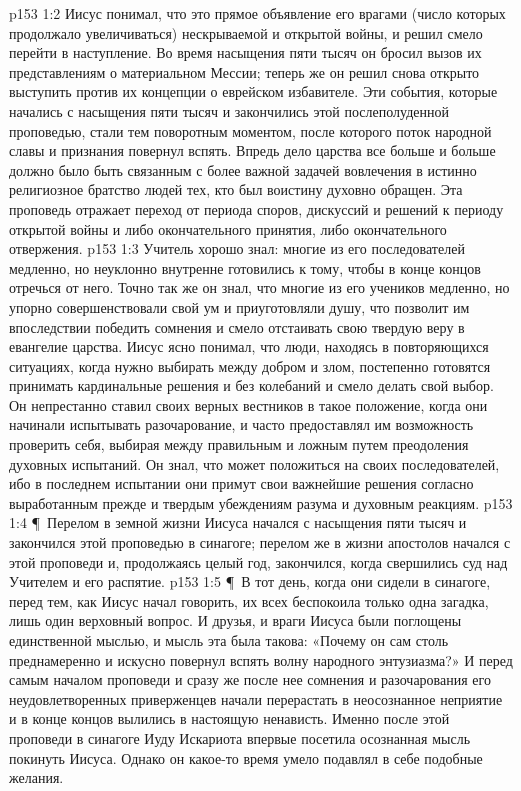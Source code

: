 \vs p153 1:2 Иисус понимал, что это прямое объявление его врагами (число которых продолжало увеличиваться) нескрываемой и открытой войны, и решил смело перейти в наступление. Во время насыщения пяти тысяч он бросил вызов их представлениям о материальном Мессии; теперь же он решил снова открыто выступить против их концепции о еврейском избавителе. Эти события, которые начались с насыщения пяти тысяч и закончились этой послеполуденной проповедью, стали тем поворотным моментом, после которого поток народной славы и признания повернул вспять. Впредь дело царства все больше и больше должно было быть связанным с более важной задачей вовлечения в истинно религиозное братство людей тех, кто был воистину духовно обращен. Эта проповедь отражает переход от периода споров, дискуссий и решений к периоду открытой войны и либо окончательного принятия, либо окончательного отвержения.
\vs p153 1:3 Учитель хорошо знал: многие из его последователей медленно, но неуклонно внутренне готовились к тому, чтобы в конце концов отречься от него. Точно так же он знал, что многие из его учеников медленно, но упорно совершенствовали свой ум и приуготовляли душу, что позволит им впоследствии победить сомнения и смело отстаивать свою твердую веру в евангелие царства. Иисус ясно понимал, что люди, находясь в повторяющихся ситуациях, когда нужно выбирать между добром и злом, постепенно готовятся принимать кардинальные решения и без колебаний и смело делать свой выбор. Он непрестанно ставил своих верных вестников в такое положение, когда они начинали испытывать разочарование, и часто предоставлял им возможность проверить себя, выбирая между правильным и ложным путем преодоления духовных испытаний. Он знал, что может положиться на своих последователей, ибо в последнем испытании они примут свои важнейшие решения согласно выработанным прежде и твердым убеждениям разума и духовным реакциям.
\vs p153 1:4 \P\ Перелом в земной жизни Иисуса начался с насыщения пяти тысяч и закончился этой проповедью в синагоге; перелом же в жизни апостолов начался с этой проповеди и, продолжаясь целый год, закончился, когда свершились суд над Учителем и его распятие.
\vs p153 1:5 \P\ В тот день, когда они сидели в синагоге, перед тем, как Иисус начал говорить, их всех беспокоила только одна загадка, лишь один верховный вопрос. И друзья, и враги Иисуса были поглощены единственной мыслью, и мысль эта была такова: «Почему он сам столь преднамеренно и искусно повернул вспять волну народного энтузиазма?» И перед самым началом проповеди и сразу же после нее сомнения и разочарования его неудовлетворенных приверженцев начали перерастать в неосознанное неприятие и в конце концов вылились в настоящую ненависть. Именно после этой проповеди в синагоге Иуду Искариота впервые посетила осознанная мысль покинуть Иисуса. Однако он какое\hyp{}то время умело подавлял в себе подобные желания.
